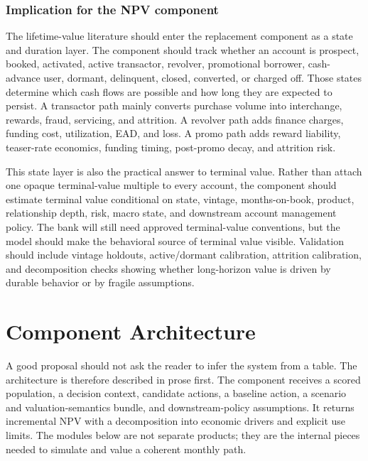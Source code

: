 \documentclass[11pt]{article}
\newcommand{\1}{\mathbf{1}}
\begin{document}
\subsubsection{Implication for the NPV component}
\label{subsec:ltv-component-implication}

The lifetime-value literature should enter the replacement component as a
state and duration layer. The component should track whether an account is
prospect, booked, activated, active transactor, revolver, promotional borrower,
cash-advance user, dormant, delinquent, closed, converted, or charged off.
Those states determine which cash flows are possible and how long they are
expected to persist. A transactor path mainly converts purchase volume into
interchange, rewards, fraud, servicing, and attrition. A revolver path adds
finance charges, funding cost, utilization, EAD, and loss. A promo path adds
reward liability, teaser-rate economics, funding timing, post-promo decay, and
attrition risk.

This state layer is also the practical answer to terminal value. Rather than
attach one opaque terminal-value multiple to every account, the component
should estimate terminal value conditional on state, vintage, months-on-book,
product, relationship depth, risk, macro state, and downstream account
management policy. The bank will still need approved terminal-value
conventions, but the model should make the behavioral source of terminal value
visible. Validation should include vintage holdouts, active/dormant calibration,
attrition calibration, and decomposition checks showing whether long-horizon
value is driven by durable behavior or by fragile assumptions.


\section{Component Architecture}
\label{sec:v4-component-architecture}

A good proposal should not ask the reader to infer the system from a table.  The
architecture is therefore described in prose first.  The component receives a
scored population, a decision context, candidate actions, a baseline action, a
scenario and valuation-semantics bundle, and downstream-policy assumptions.  It
returns incremental NPV with a decomposition into economic drivers and explicit
use limits.  The modules below are not separate products; they are the internal
pieces needed to simulate and value a coherent monthly path.
\end{document}
